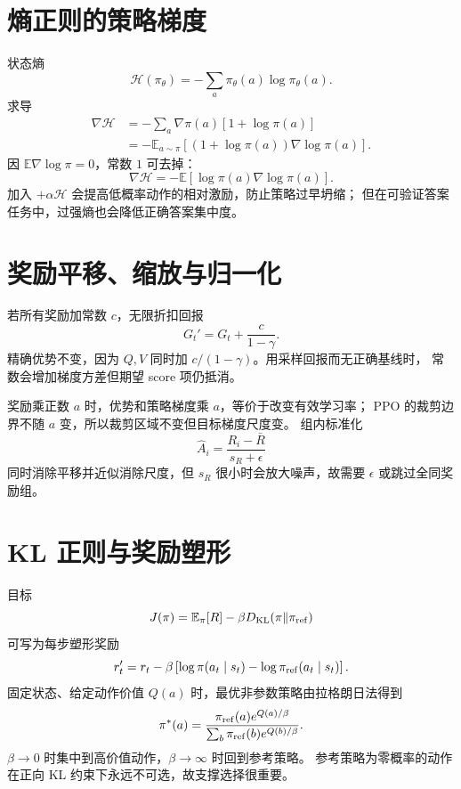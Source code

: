 \documentclass[11pt]{article}
\numberwithin{equation}{section}
\newcommand{\E}{\mathbb{E}}
\newcommand{\1}{\mathbf{1}}
\begin{document}
\section{熵正则的策略梯度}

状态熵
\begin{equation}
 \mathcal H(\pi_\theta)=-\sum_a\pi_\theta(a)\log\pi_\theta(a).
\end{equation}
求导
\begin{align}
 \nabla\mathcal H
 &=-\sum_a\nabla\pi(a)[1+\log\pi(a)]\\
 &=-\E_{a\sim\pi}
 [(1+\log\pi(a))\nabla\log\pi(a)].
\end{align}
因 $\E\nabla\log\pi=0$，常数 $1$ 可去掉：
\begin{equation}
 \nabla\mathcal H
 =-\E[\log\pi(a)\nabla\log\pi(a)].
\end{equation}
加入 $+\alpha\mathcal H$ 会提高低概率动作的相对激励，防止策略过早坍缩；
但在可验证答案任务中，过强熵也会降低正确答案集中度。

\section{奖励平移、缩放与归一化}

若所有奖励加常数 $c$，无限折扣回报
\begin{equation}
 G_t'=G_t+\frac{c}{1-\gamma}.
\end{equation}
精确优势不变，因为 $Q,V$ 同时加 $c/(1-\gamma)$。用采样回报而无正确基线时，
常数会增加梯度方差但期望 score 项仍抵消。

奖励乘正数 $a$ 时，优势和策略梯度乘 $a$，等价于改变有效学习率；
PPO 的裁剪边界不随 $a$ 变，所以裁剪区域不变但目标梯度尺度变。
组内标准化
\begin{equation}
 \widehat A_i=\frac{R_i-\bar R}{s_R+\epsilon}
\end{equation}
同时消除平移并近似消除尺度，但 $s_R$ 很小时会放大噪声，故需要 $\epsilon$ 或跳过全同奖励组。

\section{KL 正则与奖励塑形}

目标
\begin{equation}
 J(\pi)=\E_\pi[R]-\beta D_{\rm KL}(\pi\|\pi_{\rm ref})
\end{equation}
可写为每步塑形奖励
\begin{equation}
 r_t'=r_t-\beta
 \left[\log\pi(a_t\mid s_t)-\log\pi_{\rm ref}(a_t\mid s_t)\right].
\end{equation}
固定状态、给定动作价值 $Q(a)$ 时，最优非参数策略由拉格朗日法得到
\begin{equation}
 \pi^*(a)=\frac{\pi_{\rm ref}(a)e^{Q(a)/\beta}}
 {\sum_b\pi_{\rm ref}(b)e^{Q(b)/\beta}}.
\end{equation}
$\beta\to0$ 时集中到高价值动作，$\beta\to\infty$ 时回到参考策略。
参考策略为零概率的动作在正向 KL 约束下永远不可选，故支撑选择很重要。
\end{document}
